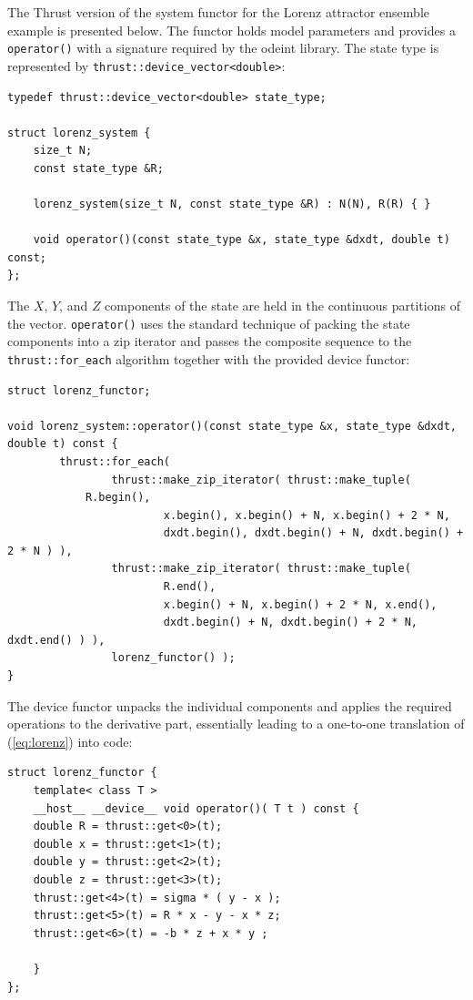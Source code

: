 \documentclass[final]{siamltex}
\newcommand{\code}[1]{\lstinline|#1|}
\newcommand{\eqref}[1]{(\ref{#1})}
\begin{document}
The Thrust version of the system functor for the Lorenz attractor ensemble
example is presented below. The functor holds model parameters and provides a
\code{operator()} with a signature required by the odeint library. The state
type is represented by \code{thrust::device_vector<double>}:
\begin{lstlisting}
typedef thrust::device_vector<double> state_type;

struct lorenz_system {
    size_t N;
    const state_type &R;

    lorenz_system(size_t N, const state_type &R) : N(N), R(R) { }

    void operator()(const state_type &x, state_type &dxdt, double t) const;
};
\end{lstlisting}
The $X$, $Y$, and $Z$ components of the state are held in the continuous
partitions of the vector.  \code{operator()} uses the standard technique of
packing the state components into a zip iterator and passes the composite
sequence to the \code{thrust::for_each} algorithm together with the provided
device functor:
\begin{lstlisting}[firstnumber=12]
struct lorenz_functor;

void lorenz_system::operator()(const state_type &x, state_type &dxdt, double t) const {
        thrust::for_each(
                thrust::make_zip_iterator( thrust::make_tuple(
			R.begin(),
                        x.begin(), x.begin() + N, x.begin() + 2 * N,
                        dxdt.begin(), dxdt.begin() + N, dxdt.begin() + 2 * N ) ),
                thrust::make_zip_iterator( thrust::make_tuple(
                        R.end(),
                        x.begin() + N, x.begin() + 2 * N, x.end(),
                        dxdt.begin() + N, dxdt.begin() + 2 * N, dxdt.end() ) ),
                lorenz_functor() );
}
\end{lstlisting}
The device functor unpacks the individual components and applies the required
operations to the derivative part, essentially leading to a one-to-one
translation of \eqref{eq:lorenz} into code:
\begin{lstlisting}[firstnumber=last]
struct lorenz_functor {
    template< class T >
    __host__ __device__ void operator()( T t ) const {
	double R = thrust::get<0>(t);
	double x = thrust::get<1>(t);
	double y = thrust::get<2>(t);
	double z = thrust::get<3>(t);
	thrust::get<4>(t) = sigma * ( y - x );
	thrust::get<5>(t) = R * x - y - x * z;
	thrust::get<6>(t) = -b * z + x * y ;

    }
};
\end{lstlisting}
\end{document}
